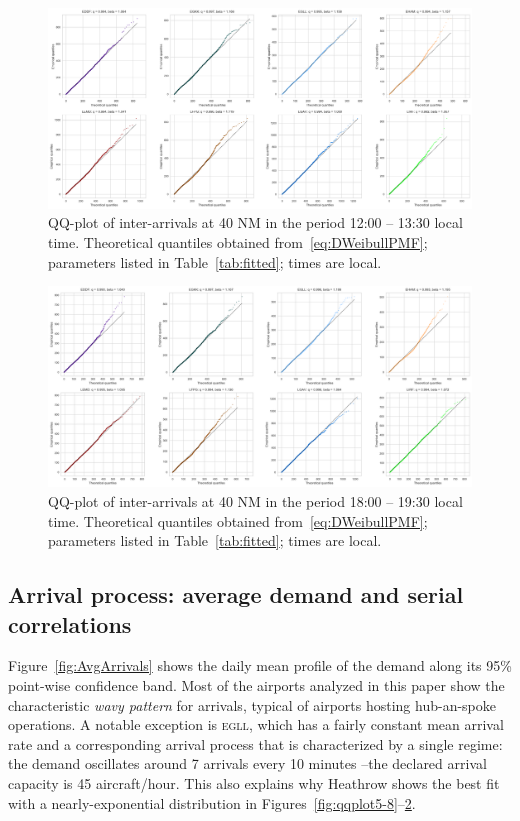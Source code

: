 \documentclass[draft,review]{elsarticle}
\newcommand{\airp}[1]{\textcolor{#1}{\textsc{#1}}}
\begin{document}
\begin{figure}
    \includegraphics[width=\textwidth]{IA_qqplot1200-1330}
    \caption{QQ-plot of inter-arrivals at 40 NM in the period 12:00 -- 13:30 local time. Theoretical quantiles obtained from~\eqref{eq:DWeibullPMF}; parameters listed in Table~\ref{tab:fitted}; times are local.}
    \label{fig:qqplot5-11}
\end{figure}

\begin{figure}
    \includegraphics[width=\textwidth]{IA_qqplot1800-1930}
    \caption{QQ-plot of inter-arrivals at 40 NM in the period 18:00 -- 19:30 local time. Theoretical quantiles obtained from~\eqref{eq:DWeibullPMF}; parameters listed in Table~\ref{tab:fitted}; times are local.}
    \label{fig:qqplot5-17}
\end{figure}

\subsection{Arrival process: average demand and serial correlations}
\label{sec:serial_corr}

Figure~\ref{fig:AvgArrivals} shows the daily mean profile of the demand along its 95\% point-wise confidence band.
Most of the airports analyzed in this paper show the characteristic \emph{wavy pattern} for arrivals, typical of airports hosting hub-an-spoke operations.
A notable exception is \airp{egll}, which has a fairly constant mean arrival rate and a corresponding arrival process that is characterized by a single regime: the demand oscillates around 7 arrivals every 10 minutes --the declared arrival capacity is 45 aircraft/hour.
This also explains why Heathrow shows the best fit with a nearly-exponential distribution in Figures~\ref{fig:qqplot5-8}--\ref{fig:qqplot5-17}.
\end{document}
